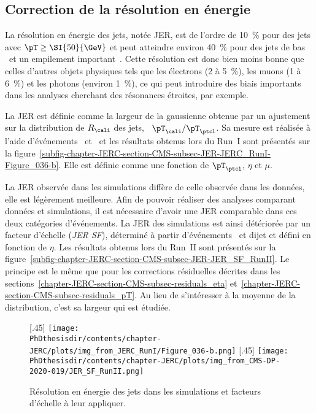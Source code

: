 \subsection{Correction de la résolution en énergie}\label{chapter-JERC-section-CMS-subsec-JER}
La résolution en énergie des jets, notée JER, est de l'ordre de \SI{10}{\%} pour des jets avec $\pT\geq\SI{50}{\GeV}$ et peut atteindre environ \SI{40}{\%} pour des jets de bas \pT\ et un empilement important~\cite{JERC_RunI}.
Cette résolution est donc bien moins bonne que celles d'autres objets physiques tels que les électrons (\num{2} à \SI{5}{\%}), les muons (\num{1} à \SI{6}{\%}) et les photons (environ \SI{1}{\%}), ce qui peut introduire des biais importants dans les analyses cherchant des résonances étroites, par exemple.
\par La JER est définie comme la largeur de la gaussienne obtenue par un ajustement sur la distribution de $R_\cali$ des jets, \ie\ $\pT_\cali/\pT_\ptcl$.
Sa mesure est réalisée à l'aide d'événements \Gjets\ et \Zjets\ et les résultats obtenus lors du Run~I sont présentés sur la figure~\ref{subfig-chapter-JERC-section-CMS-subsec-JER-JERC_RunI-Figure_036-b}.
Elle est définie comme une fonction de $\pT_\ptcl$, $\eta$ et $\mu$.
\par La JER observée dans les simulations diffère de celle observée dans les données, elle est légèrement meilleure.
Afin de pouvoir réaliser des analyses comparant données et simulations, il est nécessaire d'avoir une JER comparable dans ces deux catégories d'événements.
La JER des simulations est ainsi détériorée par un facteur d'échelle (\emph{JER SF}), déterminé à partir d'événements \Gjets\ et dijet et défini en fonction de $\eta$.
Les résultats obtenus lors du Run~II sont présentés sur la figure~\ref{subfig-chapter-JERC-section-CMS-subsec-JER-JER_SF_RunII}.
Le principe est le même que pour les corrections résiduelles décrites dans les sections~\ref{chapter-JERC-section-CMS-subsec-residuals_eta} et~\ref{chapter-JERC-section-CMS-subsec-residuals_pT}. Au lieu de s'intéresser à la moyenne de la distribution, c'est sa largeur qui est étudiée.
\begin{figure}[h]
\centering
{}[.45\textwidth]
{\texttt{[image: \\PhDthesisdir/contents/chapter-JERC/plots/img\_from\_JERC\_RunI/Figure\_036-b.png]}}
\hfill
{}[.45\textwidth]
{\texttt{[image: \\PhDthesisdir/contents/chapter-JERC/plots/img\_from\_CMS-DP-2020-019/JER\_SF\_RunII.png]}}
\caption[Résolution en énergie des jets.]{Résolution en énergie des jets dans les simulations et facteurs d'échelle à leur appliquer.}
\label{fig-chapter-JERC-section-CMS-subsec-JER}
\end{figure}
